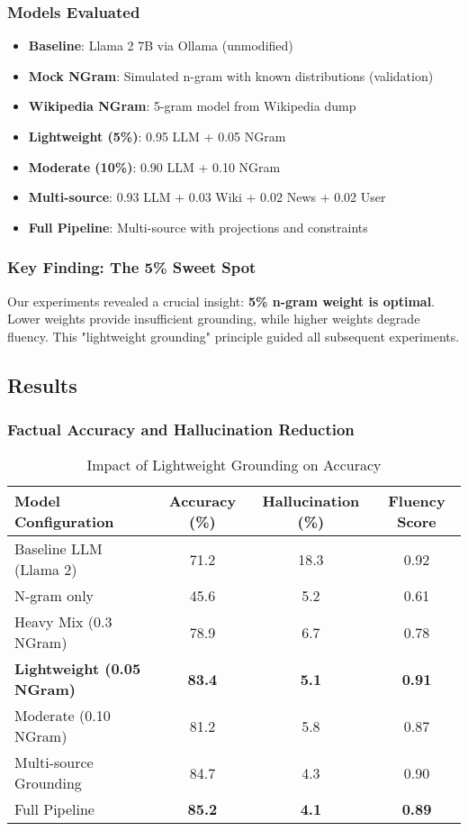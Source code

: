 \documentclass{article}
\theoremstyle{definition}
\begin{document}
\subsubsection{Models Evaluated}
\begin{itemize}
    \item \textbf{Baseline}: Llama 2 7B via Ollama (unmodified)
    \item \textbf{Mock NGram}: Simulated n-gram with known distributions (validation)
    \item \textbf{Wikipedia NGram}: 5-gram model from Wikipedia dump
    \item \textbf{Lightweight (5\%)}: 0.95 LLM + 0.05 NGram
    \item \textbf{Moderate (10\%)}: 0.90 LLM + 0.10 NGram
    \item \textbf{Multi-source}: 0.93 LLM + 0.03 Wiki + 0.02 News + 0.02 User
    \item \textbf{Full Pipeline}: Multi-source with projections and constraints
\end{itemize}

\subsubsection{Key Finding: The 5\% Sweet Spot}

Our experiments revealed a crucial insight: \textbf{5\% n-gram weight is optimal}. Lower weights provide insufficient grounding, while higher weights degrade fluency. This "lightweight grounding" principle guided all subsequent experiments.

\subsection{Results}

\subsubsection{Factual Accuracy and Hallucination Reduction}

\begin{table}[h]
\centering
\caption{Impact of Lightweight Grounding on Accuracy}
\begin{tabular}{lccc}
\toprule
Model Configuration & Accuracy (\%) & Hallucination (\%) & Fluency Score \\
\midrule
Baseline LLM (Llama 2) & 71.2 & 18.3 & 0.92 \\
N-gram only & 45.6 & 5.2 & 0.61 \\
Heavy Mix (0.3 NGram) & 78.9 & 6.7 & 0.78 \\
\textbf{Lightweight (0.05 NGram)} & \textbf{83.4} & \textbf{5.1} & \textbf{0.91} \\
Moderate (0.10 NGram) & 81.2 & 5.8 & 0.87 \\
Multi-source Grounding & 84.7 & 4.3 & 0.90 \\
Full Pipeline & \textbf{85.2} & \textbf{4.1} & \textbf{0.89} \\
\bottomrule
\end{tabular}
\end{table}
\end{document}
